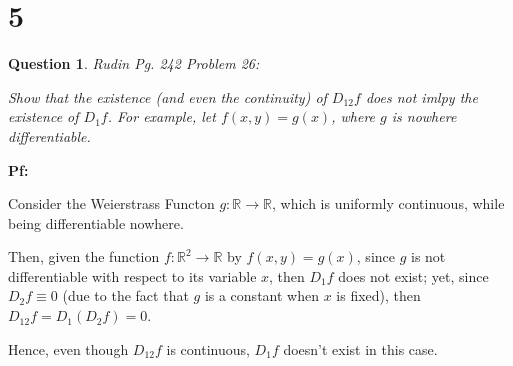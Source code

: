 \documentclass{article}
\newtheorem{question}{Question}
\begin{document}
\hfil

\hfil

\section*{5}
\begin{myBox}[]{}
    \begin{question}
        Rudin Pg. 242 Problem 26:

        Show that the existence (and even the continuity) of $D_{12}f$ does not imlpy the existence of $D_1f$. For example, let $f(x,y)=g(x)$, where $g$ is nowhere differentiable.
    \end{question}
\end{myBox}

\textbf{Pf:}

Consider the Weierstrass Functon $g:\mathbb{R}\rightarrow\mathbb{R}$, which is uniformly continuous, while being differentiable nowhere.

Then, given the function $f:\mathbb{R}^2\rightarrow\mathbb{R}$ by $f(x,y)=g(x)$, since $g$ is not differentiable with respect to its variable $x$, then $D_1f$ does not exist; yet, since $D_2f \equiv 0$ (due to the fact that $g$ is a constant when $x$ is fixed), then $D_{12}f = D_1(D_2f) = 0$.

Hence, even though $D_{12}f$ is continuous, $D_1f$ doesn't exist in this case.
\end{document}

